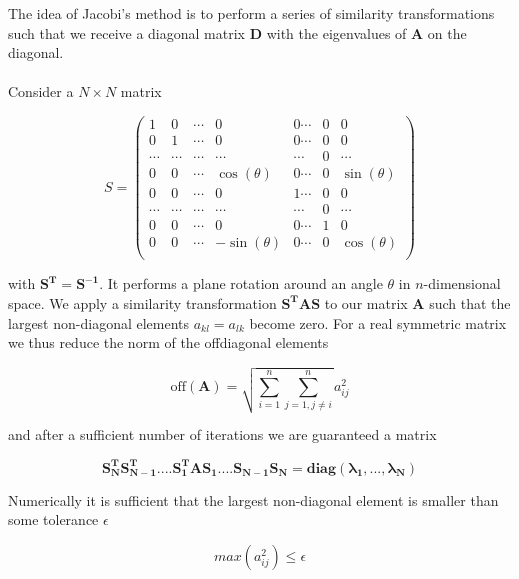 \documentclass[%
 reprint,
 nobalancelastpage,
 amsmath,amssymb,
 aps,
]{revtex4-1}
\begin{document}
The idea of Jacobi's method is to perform a series of similarity transformations such that we receive a diagonal matrix $\bm{D}$ with the eigenvalues of $\bm{A}$ on the diagonal. \\ \\
Consider a $N\times N$ matrix

\begin{equation}
S = 
	\begin{pmatrix}
		1 & 0 & \cdots & 0 & 0 \cdots & 0 & 0 \\
		0 & 1 & \cdots & 0 & 0 \cdots & 0 & 0 \\
		\cdots & \cdots & \cdots & \cdots & \cdots & 0 & \cdots \\
		0 & 0 & \cdots & \cos(\theta) & 0 \cdots & 0 & \sin(\theta) \\
		0 & 0 & \cdots & 0 & 1 \cdots & 0 & 0 \\
		\cdots & \cdots & \cdots & \cdots & \cdots & 0 & \cdots \\
		0 & 0 & \cdots & 0 & 0 \cdots & 1& 0 \\
		0 & 0 & \cdots & -\sin(\theta) & 0 \cdots & 0 & \cos(\theta) \\	
	\end{pmatrix}
\end{equation}

with $\bm{S^{T} = S^{-1}}$. It performs a plane rotation around an angle $\theta$ in $n$-dimensional space. We apply a similarity transformation $\bm{S^{T}AS}$ to our matrix $\bm{A}$ such that the largest non-diagonal elements $a_{kl} = a_{lk}$ become zero. For a real symmetric matrix we thus reduce the norm of the offdiagonal elements

\begin{equation}
	\text{off}(\bm{A}) = \sqrt{\sum_{i=1}^{n}\sum_{j=1, j\neq i}^{n}} a_{ij}^{2}
\end{equation}

and after a sufficient number of iterations we are guaranteed a matrix

\begin{equation}
	\bm{S_{N}^{T}S_{N-1}^{T}....S_{1}^{T}AS_{1}....S_{N-1}S_{N} = diag(\lambda_{1},...,\lambda_{N})}
\end{equation}

Numerically it is sufficient that the largest non-diagonal element is smaller than some tolerance $\epsilon$

\begin{equation}
	max(a_{ij}^{2}) \leq \epsilon
\end{equation}
\end{document}
